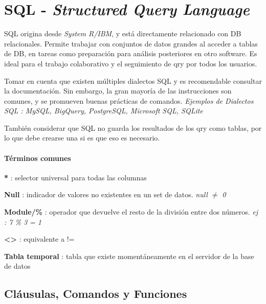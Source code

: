 
\section{SQL - \textit{Structured Query Language}}
SQL origina desde \textit{System R/IBM}, y está directamente relacionado con DB relacionales. Permite trabajar con conjuntos de datos grandes al acceder a tablas de DB, en tareas como preparación para análisis posteriores en otro software. Es ideal para el trabajo colaborativo y el seguimiento de \gls{qry} por todos los usuarios.

Tomar en cuenta que existen múltiples dialectos SQL y es recomendable consultar la documentación. Sin embargo, la gran mayoría de las instrucciones son comunes, y se promueven buenas prácticas de comandos. \textit{Ejemplos de Dialectos SQL : MySQL, BigQuery, PostgreSQL, Microsoft SQL, SQLite}

También considerar que SQL no guarda los resultados de los \gls{qry} como tablas, por lo que debe crearse una si es que eso es necesario.

\paragraph{Términos comunes}
\begin{description}
    \item {\textbf{*} : selector universal para todas las columnas}
    \item {\textbf{Null} : indicador de valores no existentes en un set de datos. \textit{null ${\neq}$ 0}} 
    \item {\textbf{Module/\%} : operador que devuelve el resto de la división entre dos números. \textit{ej : 7 \% 3 = 1}}
    \item {\textbf{<>} : equivalente a !=}
    \item {\textbf{Tabla temporal} : tabla que existe momentáneamente en el servidor de la base de datos}
    
\end{description}

\subsection{Cláusulas, Comandos y Funciones}
